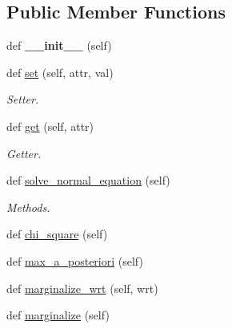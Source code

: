 \subsection*{Public Member Functions}
\begin{DoxyCompactItemize}
\item 
\mbox{\label{classasamba_1_1artificial__neural__network_1_1neural__net_ab35d35b79c522dd0f1e5bf88164e82f3}} 
def {\bfseries \+\_\+\+\_\+init\+\_\+\+\_\+} (self)
\item 
\mbox{\label{classasamba_1_1artificial__neural__network_1_1neural__net_afb2a64a48856eb07e4f48a3645d30843}} 
def \hyperlink{classasamba_1_1artificial__neural__network_1_1neural__net_afb2a64a48856eb07e4f48a3645d30843}{set} (self, attr, val)
\begin{DoxyCompactList}\small\item\em Setter. \end{DoxyCompactList}\item 
\mbox{\label{classasamba_1_1artificial__neural__network_1_1neural__net_ad916fe73e8028f451fadbdb0436da70e}} 
def \hyperlink{classasamba_1_1artificial__neural__network_1_1neural__net_ad916fe73e8028f451fadbdb0436da70e}{get} (self, attr)
\begin{DoxyCompactList}\small\item\em Getter. \end{DoxyCompactList}\item 
def \hyperlink{classasamba_1_1artificial__neural__network_1_1neural__net_a623b5424543944cb88d5a3a8889e6bbe}{solve\+\_\+normal\+\_\+equation} (self)
\begin{DoxyCompactList}\small\item\em Methods. \end{DoxyCompactList}\item 
def \hyperlink{classasamba_1_1artificial__neural__network_1_1neural__net_ac976779fd464470353ebe1f247314b8a}{chi\+\_\+square} (self)
\item 
def \hyperlink{classasamba_1_1artificial__neural__network_1_1neural__net_a333856c597f409a2ef20e07545baadf1}{max\+\_\+a\+\_\+posteriori} (self)
\item 
def \hyperlink{classasamba_1_1artificial__neural__network_1_1neural__net_a6c9272cb29ab3220ad19ffd3d35495a7}{marginalize\+\_\+wrt} (self, wrt)
\item 
def \hyperlink{classasamba_1_1artificial__neural__network_1_1neural__net_aa5832df25488526021198613fc2f6ce6}{marginalize} (self)
\end{DoxyCompactItemize}
